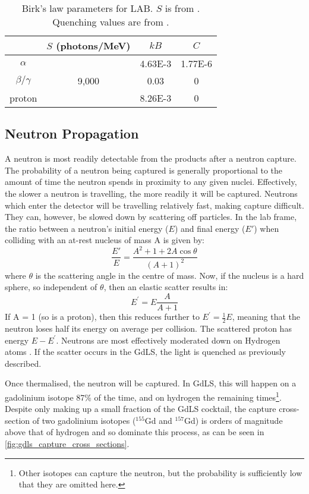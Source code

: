 \begin{table}[]
    \centering
    \begin{tabular}{c | c | c | c }
                   & $S$ (photons/MeV) & $kB$ & $C$ \\ \hline
    $\alpha$       &                   & 4.63E-3 & 1.77E-6 \\
    $\beta/\gamma$ & 9,000             & 0.03    & 0 \\ 
    proton         &                   & 8.26E-3 & 0
    \end{tabular}
    \caption{Birk's law parameters for LAB. $S$ is from \cite{scotthaselschwardt_thesis_ref}. Quenching values are from \cite{ls_proton_quenching_ref}.}
    \label{tab:Birks_law_parameters}
\end{table} 



\subsection{Neutron Propagation}
\par
A neutron is most readily detectable from the products after a neutron capture.
The probability of a neutron being captured is generally proportional to the amount of time the neutron spends in proximity to any given nuclei.
Effectively, the slower a neutron is travelling, the more readily it will be captured.
Neutrons which enter the detector will be travelling relatively fast, making capture difficult.
They can, however, be slowed down by scattering off particles.
In the lab frame, the ratio between a neutron's initial energy ($E$) and final energy ($E'$) when colliding with an at-rest nucleus of mass A is given by:
\begin{equation}
    \frac{E'}{E} = \frac{A^2 + 1 + 2A\cos{\theta}}{(A + 1)^2}
\end{equation}
where $\theta$ is the scattering angle in the centre of mass.
Now, if the nucleus is a hard sphere, so independent of $\theta$, then an elastic scatter results in:
\begin{equation}
    E^{'} = E\frac{A}{A+1}
\end{equation}
If A = 1 (so is a proton), then this reduces further to $E^{'} = \frac{1}{2}E$, meaning that the neutron loses half its energy on average per collision.
The scattered proton has energy $E - E^{'}$.
Neutrons are most effectively moderated down on Hydrogen atoms \cite{neutron_thermalisation_and_capture_ref}.
If the scatter occurs in the GdLS, the light is quenched as previously described.
\par
Once thermalised, the neutron will be captured.
In GdLS, this will happen on a gadolinium isotope 87\% of the time, and on hydrogen the remaining times\footnote{Other isotopes can capture the neutron, but the probability is sufficiently low that they are omitted here.}.
Despite only making up a small fraction of the GdLS cocktail, the capture cross-section of two gadolinium isotopes (${}^{155}$Gd and ${}^{157}$Gd) is orders of magnitude above that of hydrogen and so dominate this process, as can be seen in \autoref{fig:gdls_capture_cross_sections}.


